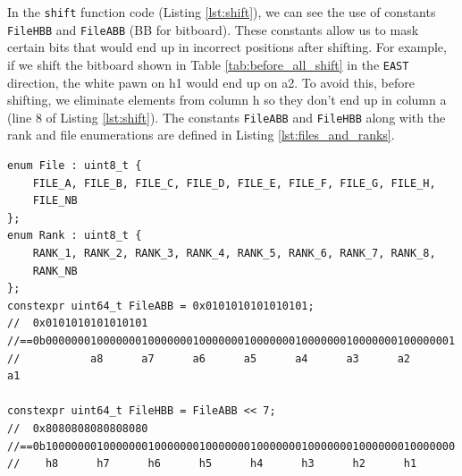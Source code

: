 \documentclass[12pt,a4paper,twoside,openright]{book}
\begin{document}
In the \texttt{shift} function code (Listing \ref{lst:shift}), we can see the use of constants \texttt{FileHBB} and \texttt{FileABB} ({\ttfamily BB} for bitboard). These constants allow us to mask certain bits that would end up in incorrect positions after shifting. For example, if we shift the bitboard shown in Table \ref{tab:before_all_shift} in the \texttt{EAST} direction, the white pawn on {\ttfamily h1} would end up on {\ttfamily a2}. To avoid this, before shifting, we eliminate elements from column {\ttfamily h} so they don't end up in column {\ttfamily a} (line 8 of Listing \ref{lst:shift}). The constants \texttt{FileABB} and \texttt{FileHBB} along with the rank and file enumerations are defined in Listing \ref{lst:files_and_ranks}.    

\begin{mdframed}[skipabove=\baselineskip,hidealllines=true]
\begin{verbatim}
enum File : uint8_t {
    FILE_A, FILE_B, FILE_C, FILE_D, FILE_E, FILE_F, FILE_G, FILE_H,
    FILE_NB
};
enum Rank : uint8_t {
    RANK_1, RANK_2, RANK_3, RANK_4, RANK_5, RANK_6, RANK_7, RANK_8,
    RANK_NB
};
constexpr uint64_t FileABB = 0x0101010101010101;
//  0x0101010101010101
//==0b0000000100000001000000010000000100000001000000010000000100000001
//           a8      a7      a6      a5      a4      a3      a2      a1

constexpr uint64_t FileHBB = FileABB << 7;
//  0x8080808080808080
//==0b1000000010000000100000001000000010000000100000001000000010000000
//    h8      h7      h6      h5      h4      h3      h2      h1
\end{verbatim}
\label{lst:files_and_ranks}
\end{mdframed}
\end{document}
